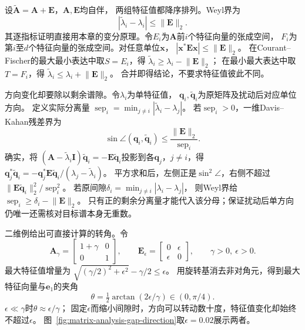 设$\widetilde{\bm A}=\bm A+\bm E$，$\bm A,\bm E$均自伴，
两组特征值都降序排列。Weyl界为
\begin{equation}
 |\widetilde\lambda_i-\lambda_i|\leq\lVert\bm E\rVert_2.
 \label{eq:matrix-analysis-weyl-eigenvalue-perturbation}
\end{equation}
其逐指标证明直接用本章的变分原理。令$E_i$为$\bm A$前$i$个特征向量的张成空间，
$F_i$为第$i$至$d$个特征向量的张成空间。对任意单位$\bm x$，
$|\bm x^*\bm E\bm x|\leq\lVert\bm E\rVert_2$。
在Courant--Fischer的最大最小表达中取$S=E_i$，得
$\widetilde\lambda_i\geq\lambda_i-\lVert\bm E\rVert_2$；
在最小最大表达中取$T=F_i$，得
$\widetilde\lambda_i\leq\lambda_i+\lVert\bm E\rVert_2$。
合并即得结论，不要求特征值彼此不同。

方向变化却要除以剩余谱隙。令$\lambda_i$为单特征值，
$\bm q_i,\widetilde{\bm q}_i$为原矩阵及扰动后对应单位方向。
定义实际分离量
$\operatorname{sep}_i=\min_{j\neq i}|\widetilde\lambda_i-\lambda_j|$。
若$\operatorname{sep}_i>0$，一维Davis--Kahan残差界为
\begin{equation}
 \sin\angle(\bm q_i,\widetilde{\bm q}_i)
 \leq\frac{\lVert\bm E\rVert_2}{\operatorname{sep}_i}.
 \label{eq:matrix-analysis-eigenvector-gap-bound}
\end{equation}
确实，将
$(\bm A-\widetilde\lambda_i\bm I)\widetilde{\bm q}_i
=-\bm E\widetilde{\bm q}_i$投影到各$\bm q_j$，$j\neq i$，得
$\bm q_j^*\widetilde{\bm q}_i
=-\bm q_j^*\bm E\widetilde{\bm q}_i/(\lambda_j-\widetilde\lambda_i)$。
平方求和后，左侧正是$\sin^2\angle$，右侧不超过
$\lVert\bm E\widetilde{\bm q}_i\rVert_2^2/\operatorname{sep}_i^2$。
若原间隙$\delta_i=\min_{j\neq i}|\lambda_i-\lambda_j|$，
则Weyl界给$\operatorname{sep}_i\geq\delta_i-\lVert\bm E\rVert_2$。
只有正的剩余分离量才能代入该分母；保证扰动后单方向仍唯一还需核对目标谱本身无重数。

二维例给出可直接计算的转角。令
\[
 \bm A_\gamma=\begin{bmatrix}1+\gamma&0\\0&1\end{bmatrix},\qquad
 \bm E_\epsilon=\begin{bmatrix}0&\epsilon\\\epsilon&0\end{bmatrix},
 \qquad\gamma>0,\ \epsilon>0.
\]
最大特征值增量为
$\sqrt{(\gamma/2)^2+\epsilon^2}-\gamma/2\leq\epsilon$。
用旋转基消去非对角元，得到最大特征向量与$\bm e_1$的夹角
\[
 \theta=\tfrac12\arctan(2\epsilon/\gamma)\in(0,\pi/4).
\]
$\epsilon\ll\gamma$时$\theta\approx\epsilon/\gamma$；
固定$\epsilon$而缩小间隙时，方向可以转动数十度，特征值变化却始终不超过$\epsilon$。
图~\ref{fig:matrix-analysis-gap-direction}取$\epsilon=0.02$展示两者。

